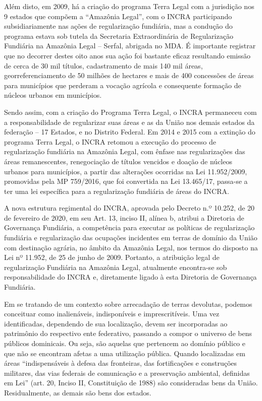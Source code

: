 \documentclass[
  letterpaper,
]{report}
\begin{document}
Além disto, em 2009, há a criação do programa Terra Legal com a
jurisdição nos 9 estados que compõem a ``Amazônia Legal'', com o INCRA
participando subsidiariamente nas ações de regularização fundiária, mas
a condução do programa estava sob tutela da Secretaria Extraordinária de
Regularização Fundiária na Amazônia Legal -- Serfal, abrigada no MDA. É
importante registrar que no decorrer destes oito anos sua ação foi
bastante eficaz resultando emissão de cerca de 30 mil títulos,
cadastramento de mais 140 mil áreas, georreferenciamento de 50 milhões
de hectares e mais de 400 concessões de áreas para municípios que
perderam a vocação agrícola e consequente formação de núcleos urbanos em
municípios.~~

Sendo assim, com a criação do Programa Terra Legal, o INCRA permaneceu
com a responsabilidade de regularizar suas áreas e as da União nos
demais estados da federação -- 17 Estados, e no Distrito Federal. Em
2014 e 2015 com a extinção do programa Terra Legal, o INCRA retomou a
execução do processo de regularização fundiária na Amazônia Legal, com
ênfase nas regularizações das áreas remanescentes, renegociação de
títulos vencidos e doação de núcleos urbanos para municípios, a partir
das alterações ocorridas na Lei 11.952/2009, promovidas pela MP
759/2016, que foi convertida na Lei 13.465/17, passa-se a ter uma lei
específica para a regularização fundiária de áreas do INCRA.~~

A nova estrutura regimental do INCRA, aprovada pelo Decreto n.º 10.252,
de 20 de fevereiro de 2020, em seu Art. 13, inciso II, alínea b, atribui
a Diretoria de Governança Fundiária, a competência para executar as
políticas de regularização fundiária e regularização das ocupações
incidentes em terras de domínio da União com destinação agrária, no
âmbito da Amazônia Legal, nos termos do disposto na Lei nº 11.952, de 25
de junho de 2009. Portanto, a atribuição legal de regularização
Fundiária na Amazônia Legal, atualmente encontra-se sob responsabilidade
do INCRA e, diretamente ligado à esta Diretoria de Governança
Fundiária.~~

Em se tratando de um contexto sobre arrecadação de terras devolutas,
podemos conceituar como inalienáveis, indisponíveis e imprescritíveis.
Uma vez identificadas, dependendo de sua localização, devem ser
incorporadas ao patrimônio do respectivo ente federativo, passando a
compor o universo de bens públicos dominicais. Ou seja, são aquelas que
pertencem ao domínio público e que não se encontram afetas a uma
utilização pública. Quando localizadas em áreas ``indispensáveis à
defesa das fronteiras, das fortificações e construções militares, das
vias federais de comunicação e a preservação ambiental, definidas em
Lei'' (art. 20, Inciso II, Constituição de 1988) são consideradas bens
da União. Residualmente, as demais são bens dos estados.~~
\end{document}
